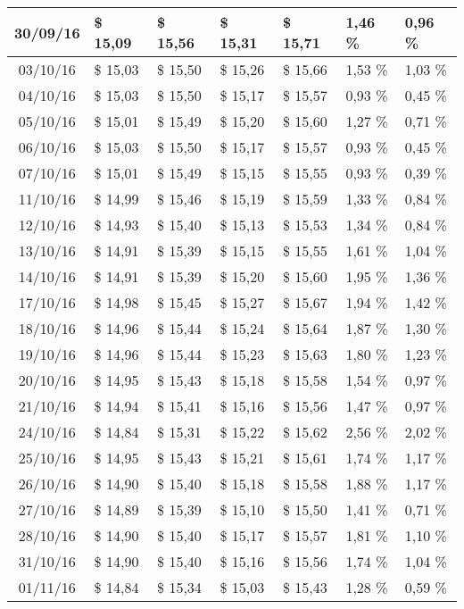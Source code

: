\begin{center}
\begin{longtable}{|c|p{1.5cm}|p{1.5cm}|p{1.5cm}|p{1.5cm}|p{1.5cm}|p{1.5cm}|}
30/09/16 & \$ 15,09 & \$ 15,56 & \$ 15,31 & \$ 15,71 & 1,46 \% & 0,96 \% \\ \hline
03/10/16 & \$ 15,03 & \$ 15,50 & \$ 15,26 & \$ 15,66 & 1,53 \% & 1,03 \% \\ \hline
04/10/16 & \$ 15,03 & \$ 15,50 & \$ 15,17 & \$ 15,57 & 0,93 \% & 0,45 \% \\ \hline
05/10/16 & \$ 15,01 & \$ 15,49 & \$ 15,20 & \$ 15,60 & 1,27 \% & 0,71 \% \\ \hline
06/10/16 & \$ 15,03 & \$ 15,50 & \$ 15,17 & \$ 15,57 & 0,93 \% & 0,45 \% \\ \hline
07/10/16 & \$ 15,01 & \$ 15,49 & \$ 15,15 & \$ 15,55 & 0,93 \% & 0,39 \% \\ \hline
11/10/16 & \$ 14,99 & \$ 15,46 & \$ 15,19 & \$ 15,59 & 1,33 \% & 0,84 \% \\ \hline
12/10/16 & \$ 14,93 & \$ 15,40 & \$ 15,13 & \$ 15,53 & 1,34 \% & 0,84 \% \\ \hline
13/10/16 & \$ 14,91 & \$ 15,39 & \$ 15,15 & \$ 15,55 & 1,61 \% & 1,04 \% \\ \hline
14/10/16 & \$ 14,91 & \$ 15,39 & \$ 15,20 & \$ 15,60 & 1,95 \% & 1,36 \% \\ \hline
17/10/16 & \$ 14,98 & \$ 15,45 & \$ 15,27 & \$ 15,67 & 1,94 \% & 1,42 \% \\ \hline
18/10/16 & \$ 14,96 & \$ 15,44 & \$ 15,24 & \$ 15,64 & 1,87 \% & 1,30 \% \\ \hline
19/10/16 & \$ 14,96 & \$ 15,44 & \$ 15,23 & \$ 15,63 & 1,80 \% & 1,23 \% \\ \hline
20/10/16 & \$ 14,95 & \$ 15,43 & \$ 15,18 & \$ 15,58 & 1,54 \% & 0,97 \% \\ \hline
21/10/16 & \$ 14,94 & \$ 15,41 & \$ 15,16 & \$ 15,56 & 1,47 \% & 0,97 \% \\ \hline
24/10/16 & \$ 14,84 & \$ 15,31 & \$ 15,22 & \$ 15,62 & 2,56 \% & 2,02 \% \\ \hline
25/10/16 & \$ 14,95 & \$ 15,43 & \$ 15,21 & \$ 15,61 & 1,74 \% & 1,17 \% \\ \hline
26/10/16 & \$ 14,90 & \$ 15,40 & \$ 15,18 & \$ 15,58 & 1,88 \% & 1,17 \% \\ \hline
27/10/16 & \$ 14,89 & \$ 15,39 & \$ 15,10 & \$ 15,50 & 1,41 \% & 0,71 \% \\ \hline
28/10/16 & \$ 14,90 & \$ 15,40 & \$ 15,17 & \$ 15,57 & 1,81 \% & 1,10 \% \\ \hline
31/10/16 & \$ 14,90 & \$ 15,40 & \$ 15,16 & \$ 15,56 & 1,74 \% & 1,04 \% \\ \hline
01/11/16 & \$ 14,84 & \$ 15,34 & \$ 15,03 & \$ 15,43 & 1,28 \% & 0,59 \% \\ \hline

\end{longtable}
\end{center}

